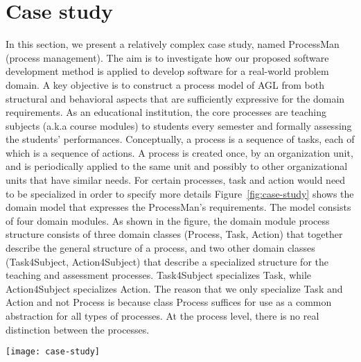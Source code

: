 \section{Case study}
\label{sect:case-study} %

In this section, we present a relatively complex case study, named ProcessMan (process management). The aim is to investigate how our proposed software development method is applied to develop software for a real-world problem domain. A key objective is to construct a process model of AGL from both structural and behavioral aspects that are sufficiently expressive for the domain requirements. As an educational institution, the core processes are teaching subjects (a.k.a course modules) to students every semester and formally assessing the students’ performances. Conceptually, a process is a sequence of tasks, each of which is a sequence of actions. A process is created once, by an organization unit, and is periodically applied to the same unit and possibly to other organizational units that have similar needs. For certain processes, task and action would need to be specialized in order to specify more details
Figure~\ref{fig:case-study} shows the domain model that expresses the ProcessMan’s requirements. The model consists of four domain modules. As shown in the figure, the domain module process structure consists of three domain classes (Process, Task, Action) that together describe the general structure of a process, and two other domain classes (Task4Subject, Action4Subject) that describe a specialized structure for the teaching and assessment processes. Task4Subject specializes Task, while Action4Subject specializes Action. The reason that we only specialize Task and Action and not Process is because class Process suffices for use as a common abstraction for all types of processes. At the process level, there is no real distinction between the processes.

\begin{figure*}[ht]
	\centering
	\texttt{[image: case-study]}
	\caption{the model execution of process management} %
	\label{fig:case-study}
\end{figure*}
